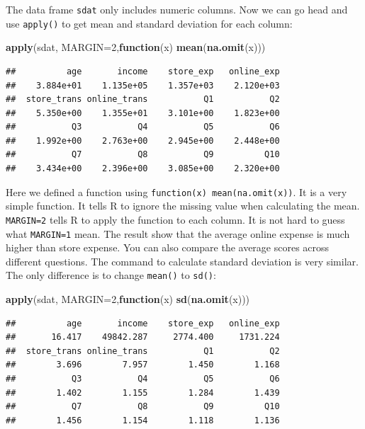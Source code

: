 \documentclass[12pt,]{krantz}
\newenvironment{Shaded}{\begin{snugshade}}{\end{snugshade}}
\newcommand{\KeywordTok}[1]{\textcolor[rgb]{0.13,0.29,0.53}{\textbf{#1}}}
\newcommand{\DataTypeTok}[1]{\textcolor[rgb]{0.13,0.29,0.53}{#1}}
\newcommand{\DecValTok}[1]{\textcolor[rgb]{0.00,0.00,0.81}{#1}}
\newcommand{\ControlFlowTok}[1]{\textcolor[rgb]{0.13,0.29,0.53}{\textbf{#1}}}
\newcommand{\NormalTok}[1]{#1}
\theoremstyle{definition}
\theoremstyle{definition}
\theoremstyle{definition}
\theoremstyle{remark}
\begin{document}
The data frame \texttt{sdat} only includes numeric columns. Now we can
go head and use \texttt{apply()} to get mean and standard deviation for
each column:

\begin{Shaded}
\begin{Highlighting}[]
\KeywordTok{apply}\NormalTok{(sdat, }\DataTypeTok{MARGIN=}\DecValTok{2}\NormalTok{,}\ControlFlowTok{function}\NormalTok{(x) }\KeywordTok{mean}\NormalTok{(}\KeywordTok{na.omit}\NormalTok{(x)))}
\end{Highlighting}
\end{Shaded}

\begin{verbatim}
##          age       income    store_exp   online_exp 
##    3.884e+01    1.135e+05    1.357e+03    2.120e+03 
##  store_trans online_trans           Q1           Q2 
##    5.350e+00    1.355e+01    3.101e+00    1.823e+00 
##           Q3           Q4           Q5           Q6 
##    1.992e+00    2.763e+00    2.945e+00    2.448e+00 
##           Q7           Q8           Q9          Q10 
##    3.434e+00    2.396e+00    3.085e+00    2.320e+00
\end{verbatim}

Here we defined a function using \texttt{function(x)\ mean(na.omit(x))}.
It is a very simple function. It tells R to ignore the missing value
when calculating the mean. \texttt{MARGIN=2} tells R to apply the
function to each column. It is not hard to guess what \texttt{MARGIN=1}
mean. The result show that the average online expense is much higher
than store expense. You can also compare the average scores across
different questions. The command to calculate standard deviation is very
similar. The only difference is to change \texttt{mean()} to
\texttt{sd()}:

\begin{Shaded}
\begin{Highlighting}[]
\KeywordTok{apply}\NormalTok{(sdat, }\DataTypeTok{MARGIN=}\DecValTok{2}\NormalTok{,}\ControlFlowTok{function}\NormalTok{(x) }\KeywordTok{sd}\NormalTok{(}\KeywordTok{na.omit}\NormalTok{(x)))}
\end{Highlighting}
\end{Shaded}

\begin{verbatim}
##          age       income    store_exp   online_exp 
##       16.417    49842.287     2774.400     1731.224 
##  store_trans online_trans           Q1           Q2 
##        3.696        7.957        1.450        1.168 
##           Q3           Q4           Q5           Q6 
##        1.402        1.155        1.284        1.439 
##           Q7           Q8           Q9          Q10 
##        1.456        1.154        1.118        1.136
\end{verbatim}
\end{document}
